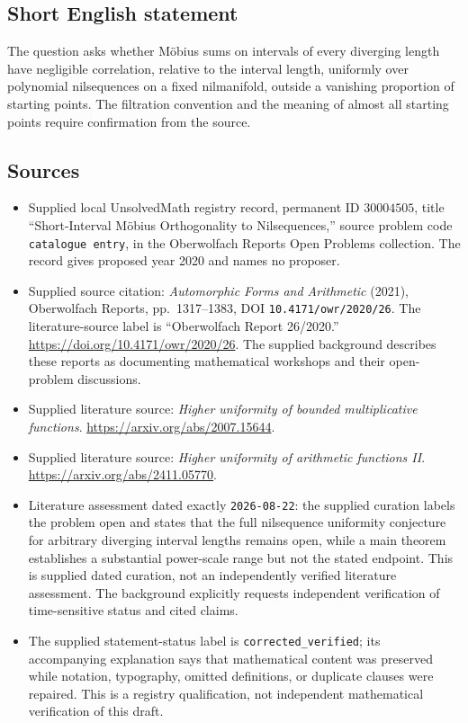 \documentclass[11pt]{article}
\begin{document}
\subsection{Short English statement}
The question asks whether M\"obius sums on intervals of every diverging length have negligible correlation, relative to the interval length, uniformly over polynomial nilsequences on a fixed nilmanifold, outside a vanishing proportion of starting points. The filtration convention and the meaning of almost all starting points require confirmation from the source.
\subsection{Sources}
\begin{itemize}
\item Supplied local UnsolvedMath registry record, permanent ID \(30004505\), title ``Short-Interval M\"obius Orthogonality to Nilsequences,'' source problem code \texttt{catalogue entry}, in the Oberwolfach Reports Open Problems collection. The record gives proposed year 2020 and names no proposer.
\item Supplied source citation: \emph{Automorphic Forms and Arithmetic} (2021), Oberwolfach Reports, pp.\ 1317--1383, DOI \texttt{10.4171/owr/2020/26}. The literature-source label is ``Oberwolfach Report 26/2020.'' \url{https://doi.org/10.4171/owr/2020/26}. The supplied background describes these reports as documenting mathematical workshops and their open-problem discussions.
\item Supplied literature source: \emph{Higher uniformity of bounded multiplicative functions}. \url{https://arxiv.org/abs/2007.15644}.
\item Supplied literature source: \emph{Higher uniformity of arithmetic functions II}. \url{https://arxiv.org/abs/2411.05770}.
\item Literature assessment dated exactly \texttt{2026-08-22}: the supplied curation labels the problem open and states that the full nilsequence uniformity conjecture for arbitrary diverging interval lengths remains open, while a main theorem establishes a substantial power-scale range but not the stated endpoint. This is supplied dated curation, not an independently verified literature assessment. The background explicitly requests independent verification of time-sensitive status and cited claims.
\item The supplied statement-status label is \texttt{corrected\_verified}; its accompanying explanation says that mathematical content was preserved while notation, typography, omitted definitions, or duplicate clauses were repaired. This is a registry qualification, not independent mathematical verification of this draft.
\end{itemize}
\end{document}
